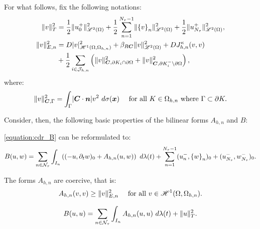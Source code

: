 For what follows, fix the following notations:
\begin{align} %
    \lVert v \rVert_{T}^2 &= \frac{1}{2} \lVert u_0^+ \rVert_{\SpaceLp{2}(\Omega)}^2 + \frac{1}{2} \sum_{n = 1}^{\nTimeIndices - 1} \lVert \left\{ v \right\}_n \rVert_{\SpaceLp{2}(\Omega)}^2 + \frac{1}{2} \lVert u_{\nTimeIndices}^+ \rVert_{\SpaceLp{2}(\Omega)}^2, \\
    \lVert v \rVert_{E, n}^2 &= \Diffusion \lvert v \rvert_{\SpaceHk{1}(\Omega, \Omega_{h, n})}^2 + \BoundC{\Reaction \Convection} \lVert v \rVert_{\SpaceLp{2}(\Omega)}^2 + \Diffusion J^{\kappa}_{h, n}(v, v) \\
    &+ \frac{1}{2} \sum_{i \in \SpaceTimeIndices} \left( \lVert v \rVert_{\Convection, \partial K_i \cap \partial \Omega}^2 + \lVert v \rVert_{\Convection, \partial K_i^- \setminus \partial \Omega}^2 \right),
\end{align}
where:
\begin{align}
    \lVert v \rVert_{\bm{C}, \Gamma}^2 &= \int_{\Gamma} \lvert \bm{C} \cdot \bm{n} \rvert v^2 ~ d \sigma(\bm{x}) &\text{ for all } K \in \Omega_{h, n} \text{ where } \Gamma \subset \partial K.
\end{align}

Consider, then, the following basic properties of the bilinear forms $A_{h, n}$ and $B$:

\begin{lemma}[Reformulation of $B$]
    \cref{equation:cdr_B} can be reformulated to:
    \begin{align}
        B(u, w) = \sum_{n \in \mathcal{N}_{\tau}} \int_{I_n} \left( (-u, \partial_t w )_0 + A_{h, n}(u, w) \right) ~ d \lambda(t) + \sum_{n = 1}^{N_{\tau} - 1} (u_n^-, \left\{ w \right\}_n )_0 + (u_{N_{\tau}}^-, w_{N_{\tau}}^-)_0. \label{equation:cdr_B_reformulated}
    \end{align}
\end{lemma}

\begin{lemma}[Coercivity of $A_{h, n}$]
    The forms $A_{h, n}$ are coercive, that is:
    \begin{align}
        A_{h, n}(v, v) &\geq \lVert v \rVert_{E, n}^2 &\text{ for all } v \in \mathscr{H}^{1}(\Omega, \Omega_{h, n}).
    \end{align}
\end{lemma}

\begin{lemma}[Coercivity of $B$]
    \begin{align}
        B(u, u) = \sum_{n \in \mathcal{N}_{\tau}} \int_{I_n} A_{h, n}(u, u) ~ d \lambda(t) + \lVert u \rVert_{T}^2.
    \end{align}
\end{lemma}

